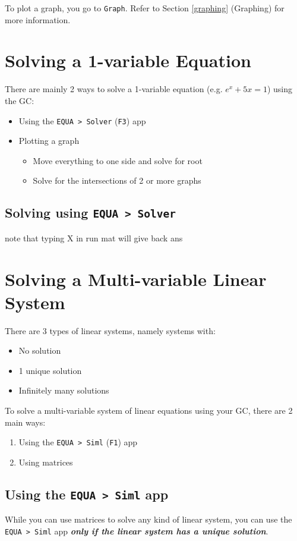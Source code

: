 \documentclass[a5paper,draft]{memoir}
\def\code#1{\texttt{#1}}
\begin{document}
To plot a graph, you go to \code{Graph}. Refer to Section \ref{graphing} (Graphing) for more information.

\section{Solving a 1-variable Equation}
There are mainly 2 ways to solve a 1-variable equation (e.g. $e^x + 5x = 1$) using the GC:
\begin{itemize}
	\item Using the \code{EQUA > Solver} (\code{F3}) app
	\item Plotting a graph
	\begin{itemize}
		\item Move everything to one side and solve for root
		\item Solve for the intersections of 2 or more graphs
	\end{itemize}
\end{itemize}

\subsection{Solving using \code{EQUA > Solver}}

note that typing X in run mat will give back ans

\section{Solving a Multi-variable Linear System}
There are 3 types of linear systems, namely systems with:
\begin{itemize}
	\item No solution
	\item 1 unique solution
	\item Infinitely many solutions
\end{itemize}

To solve a multi-variable system of linear equations using your GC, there are 2 main ways:
\begin{enumerate}
	\item Using the \code{EQUA > Siml} (\code{F1}) app
	\item Using matrices
\end{enumerate}

\subsection{Using the \code{EQUA > Siml} app}
While you can use matrices to solve any kind of linear system, you can use the \code{EQUA > Siml} app \textit{\textbf{only if the linear system has a unique solution}}.
\end{document}
